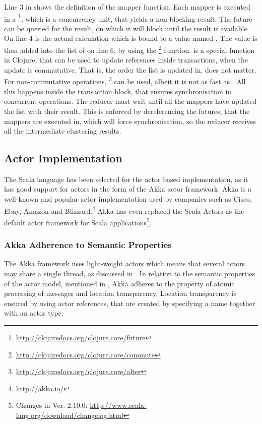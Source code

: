 Line 3 in  shows the definition of the mapper function. Each mapper is executed in a \footnote{\url{http://clojuredocs.org/clojure.core/future}}, which is a concurrency unit, that yields a non-blocking result. The future can be queried for the result, on which it will block until the result is available. On line 4 is the actual calculation which is bound to a value named . The  value is then added into the list of  on line 6, by using the \footnote{\url{http://clojuredocs.org/clojure.core/commute}} function.  is a special function in Clojure, that can be used to update references inside transactions, when the update is commutative. That is, the order the list is updated in, does not matter. For non-commutative operations, \footnote{\url{http://clojuredocs.org/clojure.core/alter}} can be used, albeit it is not as fast as . All this happens inside the  transaction block, that ensures synchronisation in concurrent operations. The reducer must wait until all the mappers have updated the list with their result. This is enforced by dereferencing the futures, that the mappers are executed in, which will force synchronisation, so the reducer receives all the intermediate clustering results.

\subsection{Actor Implementation}
The Scala language has been selected for the actor based implementation, as it has good support for actors in the form of the Akka actor framework. Akka is a well-known and popular actor implementation used by companies such as Cisco, Ebay, Amazon and Blizzard.\footnote{\url{http://akka.io/}} Akka has even replaced the Scala Actors as the default actor framework for Scala applications\footnote{Changes in Ver. 2.10.0: \url{http://www.scala-lang.org/download/changelog.html}}.

\subsubsection{Akka Adherence to Semantic Properties}
The Akka framework uses light-weight actors which means that several actors may share a single thread\cite[p. 13]{akkaDoc}, as discussed in . 
In relation to the semantic properties of the actor model, mentioned in , Akka adheres to the property of atomic processing of messages and location transparency. Location transparency is ensured by using actor references, that are created by specifying a name together with an actor type\cite[p. 24]{akkaDoc}. 

